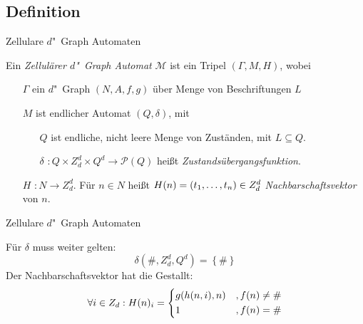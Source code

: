 \documentclass[18pt]{beamer}
\newcommand{\defWord}[1]{\emph{#1}}
\begin{document}
\subsection{Definition}
\begin{frame}{Zellulare $d$"~Graph Automaten}
	\begin{definition}
		Ein \defWord{Zellulärer $d$"~Graph Automat} $\mathcal{M}$ ist ein Tripel $\left(\Gamma, M, H\right)$, wobei
		\begin{itemize}
			\item[$\Gamma$] ein $d$"~Graph $\left(N, A, f, g\right)$ über Menge von Beschriftungen $L$
			\item[$M$]  ist endlicher Automat $\left(Q, \delta\right)$, mit 
			\begin{itemize}
				\item[$Q$] ist endliche, nicht leere Menge von Zuständen, mit $L \subseteq Q$.
				\item[$\delta$] $: Q \times Z_d^d \times Q^d \rightarrow \mathcal{P}\left(Q\right)$  heißt \defWord{Zustandsübergangsfunktion}.
			\end{itemize}
			\item[$H$] $: N \rightarrow Z_d^d$. 
			Für $n \in N$ heißt $H(n) = \left(t_1, \text{\dots}, t_n\right) \in Z_d^d$ \defWord{Nachbarschaftsvektor} von $n$. 
		\end{itemize}
	\end{definition}
\end{frame}
\begin{frame}{Zellulare $d$"~Graph Automaten}
	\begin{definition}
	Für $\delta$ muss weiter gelten: 
	\begin{displaymath}
		\delta \left(\#, Z_d^d, Q^d\right) = \left \{\# \right \}
	\end{displaymath}
	Der Nachbarschaftsvektor hat die Gestallt:
	\begin{displaymath}
	\forall i \in Z_d : H(n)_i = 
	\begin{dcases}
	g(h(n, i), n) & ,f(n) \neq \# \\
	1 & , f(n) = \# \\
	\end{dcases}
	\end{displaymath}
	\end{definition}
\end{frame}

\end{document}
